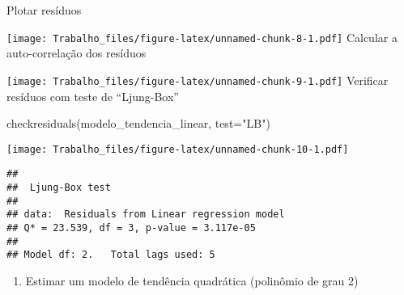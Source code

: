 \documentclass[
]{article}
\newenvironment{Shaded}{\begin{snugshade}}{\end{snugshade}}
\newcommand{\AttributeTok}[1]{\textcolor[rgb]{0.77,0.63,0.00}{#1}}
\newcommand{\DecValTok}[1]{\textcolor[rgb]{0.00,0.00,0.81}{#1}}
\newcommand{\FunctionTok}[1]{\textcolor[rgb]{0.00,0.00,0.00}{#1}}
\newcommand{\NormalTok}[1]{#1}
\newcommand{\SpecialCharTok}[1]{\textcolor[rgb]{0.00,0.00,0.00}{#1}}
\newcommand{\StringTok}[1]{\textcolor[rgb]{0.31,0.60,0.02}{#1}}
\providecommand{\tightlist}{%
  \setlength{\itemsep}{0pt}\setlength{\parskip}{0pt}}
\begin{document}
Plotar resíduos

\begin{Shaded}
\end{Shaded}

\texttt{[image: Trabalho\_files/figure-latex/unnamed-chunk-8-1.pdf]}
Calcular a auto-correlação dos resíduos

\begin{Shaded}
\end{Shaded}

\texttt{[image: Trabalho\_files/figure-latex/unnamed-chunk-9-1.pdf]}
Verificar resíduos com teste de ``Ljung-Box''

\begin{Shaded}
\begin{Highlighting}[]
\FunctionTok{checkresiduals}\NormalTok{(modelo\_tendencia\_linear, }\AttributeTok{test=}\StringTok{"LB"}\NormalTok{)}
\end{Highlighting}
\end{Shaded}

\texttt{[image: Trabalho\_files/figure-latex/unnamed-chunk-10-1.pdf]}

\begin{verbatim}
## 
##  Ljung-Box test
## 
## data:  Residuals from Linear regression model
## Q* = 23.539, df = 3, p-value = 3.117e-05
## 
## Model df: 2.   Total lags used: 5
\end{verbatim}

\begin{enumerate}
\def\labelenumi{\arabic{enumi}.}
\setcounter{enumi}{5}
\tightlist
\item
  Estimar um modelo de tendência quadrática (polinômio de grau 2)
\end{enumerate}
\end{document}
